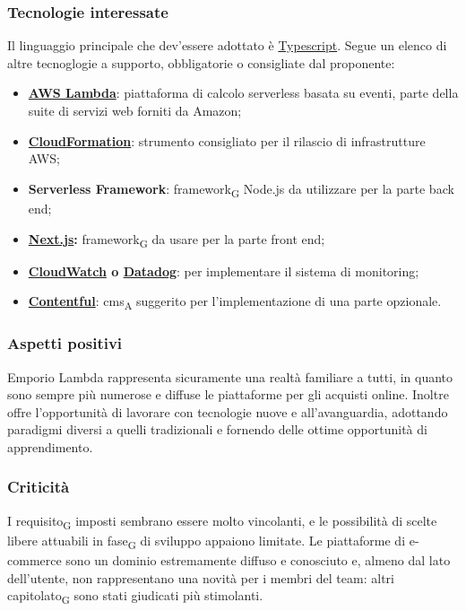 \subsubsection{Tecnologie interessate}

Il linguaggio principale che dev'essere adottato è \href{https://www.typescriptlang.org/}{Typescript}. Segue un elenco di altre tecnoglogie a supporto, obbligatorie o consigliate dal proponente:
\begin{itemize}
    \item \textbf{\href{https://aws.amazon.com/it/lambda/}{AWS Lambda}}: piattaforma di calcolo serverless basata su eventi, parte della suite di servizi web forniti da Amazon;
    \item \textbf{\href{https://aws.amazon.com/it/cloudformation/}{CloudFormation}}: strumento consigliato per il rilascio di infrastrutture AWS;
    \item \textbf{Serverless Framework}: framework\textsubscript{G} Node.js da utilizzare per la parte back end;
    \item \textbf{\href{https://nextjs.org/}{Next.js}:} framework\textsubscript{G} da usare per la parte front end;
    \item \textbf{\href{https://aws.amazon.com/it/cloudwatch/}{CloudWatch} o \href{https://www.datadoghq.com/}{Datadog}}: per implementare il sistema di monitoring;
    \item \textbf{\href{https://www.contentful.com/}{Contentful}}: cms\textsubscript{A} suggerito per l'implementazione di una parte opzionale.
\end{itemize}


\subsubsection{Aspetti positivi}

Emporio Lambda rappresenta sicuramente una realtà familiare a tutti, in quanto sono sempre più numerose e diffuse le piattaforme per gli acquisti online. Inoltre offre l'opportunità di lavorare con tecnologie nuove e all'avanguardia, adottando paradigmi diversi a quelli tradizionali e fornendo delle ottime opportunità di apprendimento.


\subsubsection{Criticità}

I requisito\textsubscript{G} imposti sembrano essere molto vincolanti, e le possibilità di scelte libere attuabili in fase\textsubscript{G} di sviluppo appaiono limitate. Le piattaforme di e-commerce sono un dominio estremamente diffuso e conosciuto e, almeno dal lato dell'utente, non rappresentano una novità per i membri del team: altri capitolato\textsubscript{G} sono stati giudicati più stimolanti.


